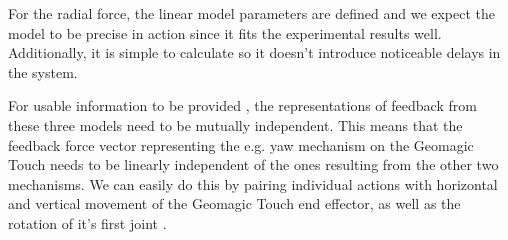 For the radial force, the linear model parameters are defined and we expect the model to be precise in action since it fits the experimental results well.
Additionally, it is simple to calculate so it doesn't introduce noticeable delays in the system.

For usable information to be provided , the representations of feedback from these three models need to be mutually independent.
This means that the feedback force vector representing the e.g. yaw mechanism on the Geomagic Touch needs to be linearly independent of the ones resulting from the other two mechanisms. 
We can easily do this by pairing individual actions with horizontal and vertical movement of the Geomagic Touch end effector, as well as the rotation of it's first joint .



